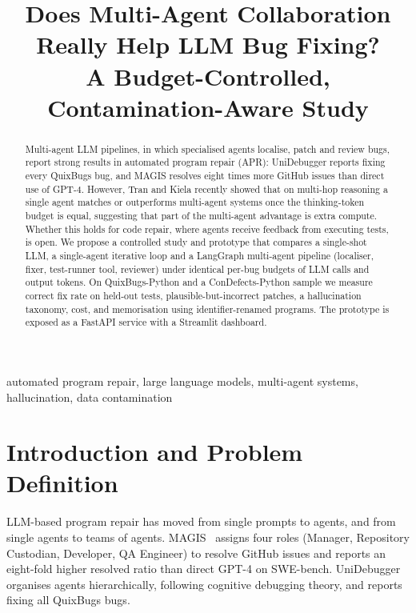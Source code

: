 \documentclass[conference]{IEEEtran}
\begin{document}
\title{Does Multi-Agent Collaboration Really Help LLM Bug Fixing?\\
A Budget-Controlled, Contamination-Aware Study}

\author{
\and
{}
\and
{}
}

\maketitle

\begin{abstract}
Multi-agent LLM pipelines, in which specialised agents localise, patch and
review bugs, report strong results in automated program repair (APR):
UniDebugger reports fixing every QuixBugs bug, and MAGIS resolves eight times
more GitHub issues than direct use of GPT-4. However, Tran and Kiela recently
showed that on multi-hop reasoning a single agent matches or outperforms
multi-agent systems once the thinking-token budget is equal, suggesting that
part of the multi-agent advantage is extra compute. Whether this holds for code
repair, where agents receive feedback from executing tests, is open. We propose
a controlled study and prototype that compares a single-shot LLM, a
single-agent iterative loop and a LangGraph multi-agent pipeline (localiser,
fixer, test-runner tool, reviewer) under identical per-bug budgets of LLM calls
and output tokens. On QuixBugs-Python and a ConDefects-Python sample we measure
correct fix rate on held-out tests, plausible-but-incorrect patches, a
hallucination taxonomy, cost, and memorisation using identifier-renamed
programs. The prototype is exposed as a FastAPI service with a Streamlit
dashboard.
\end{abstract}

\begin{IEEEkeywords}
automated program repair, large language models, multi-agent systems,
hallucination, data contamination
\end{IEEEkeywords}

\section{Introduction and Problem Definition}
LLM-based program repair has moved from single prompts to agents, and from
single agents to teams of agents. MAGIS~\cite{magis} assigns four roles
(Manager, Repository Custodian, Developer, QA Engineer) to resolve GitHub
issues and reports an eight-fold higher resolved ratio than direct GPT-4 on
SWE-bench. UniDebugger~\cite{unidebugger} organises agents hierarchically,
following cognitive debugging theory, and reports fixing all QuixBugs bugs.
\end{document}

